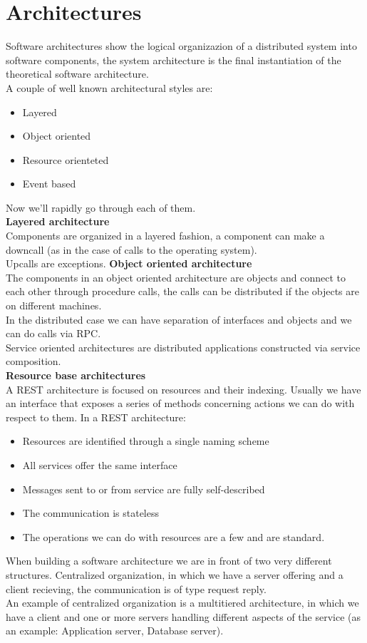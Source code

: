 \section{Architectures}
Software architectures show the logical organizazion of a distributed system into software components, the system architecture is the final instantiation of the theoretical software architecture. \\
A couple of well known architectural styles are:
\begin{itemize}
    \item Layered
    \item Object oriented
    \item Resource orienteted
    \item Event based
\end{itemize}
Now we'll rapidly go through each of them. \\
\textbf{Layered architecture} \\
Components are organized in a layered fashion, a component can make a downcall (as in the case of calls to the operating system). \\
Upcalls are exceptions.
\smallSpace
\textbf{Object oriented architecture} \\
The components in an object oriented architecture are objects and connect to each other through procedure calls, the calls can be distributed if the objects are on different machines. \\
In the distributed case we can have separation of interfaces and objects and we can do calls via RPC. \\
Service oriented architectures are distributed applications constructed via service composition. \\
\smallSpace
\textbf{Resource base architectures} \\
A REST architecture is focused on resources and their indexing. Usually we have an interface that exposes a series of methods concerning actions we can do with respect to them. In a REST architecture:
\begin{itemize}
    \item Resources are identified through a single naming scheme
    \item All services offer the same interface
    \item Messages sent to or from service are fully self-described
    \item The communication is stateless
    \item The operations we can do with resources are a few and are standard.
\end{itemize}
When building a software architecture we are in front of two very different structures. Centralized organization, in which we have a server offering and a client recieving, the communication is of type request reply. \\
An example of centralized organization is a multitiered architecture, in which we have a client and one or more servers handling different aspects of the service (as an example: Application server, Database server). \\
